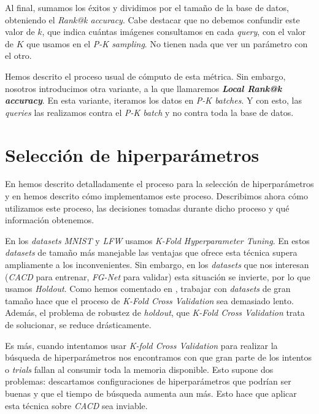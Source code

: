 Al final, sumamos los éxitos y dividimos por el tamaño de la base de datos, obteniendo el \textit{Rank@k accuracy}. Cabe destacar que no debemos confundir este valor de $k$, que indica cuántas imágenes consultamos en cada \textit{query}, con el valor de $K$ que usamos en el \textit{P-K sampling}. No tienen nada que ver un parámetro con el otro.

Hemos descrito el proceso usual de cómputo de esta métrica. Sin embargo, nosotros introducimos otra variante, a la que llamaremos \textbf{\textit{Local Rank@k accuracy}}. En esta variante, iteramos los datos en \textit{P-K batches}. Y con esto, las \textit{queries} las realizamos contra el \textit{P-K batch} y no contra toda la base de datos.

\section{Selección de hiperparámetros} \label{isec:experimentacion_hp_tuning}

En  hemos descrito detalladamente el proceso para la selección de hiperparámetros y en  hemos descrito cómo implementamos este proceso. Describimos ahora cómo utilizamos este proceso, las decisiones tomadas durante dicho proceso y qué información obtenemos.

En los \textit{datasets} \textit{MNIST} y \textit{LFW} usamos \textit{K-Fold Hyperparameter Tuning}. En estos \textit{datasets} de tamaño más manejable las ventajas que ofrece esta técnica supera ampliamente a los inconvenientes. Sin embargo, en los \textit{datasets} que nos interesan (\textit{CACD} para entrenar, \textit{FG-Net} para validar) esta situación se invierte, por lo que usamos \textit{Holdout}. Como hemos comentado en , trabajar con \textit{datasets} de gran tamaño hace que el proceso de \textit{K-Fold Cross Validation} sea demasiado lento. Además, el problema de robustez de \textit{holdout}, que \textit{K-Fold Cross Validation} trata de solucionar, se reduce drásticamente.

Es más, cuando intentamos usar \textit{K-fold Cross Validation} para realizar la búsqueda de hiperparámetros nos encontramos con que gran parte de los intentos o \textit{trials} fallan al consumir toda la memoria disponible. Esto supone dos problemas: descartamos configuraciones de hiperparámetros que podrían ser buenas y que el tiempo de búsqueda aumenta aun más. Esto hace que aplicar esta técnica sobre \textit{CACD} sea inviable.

